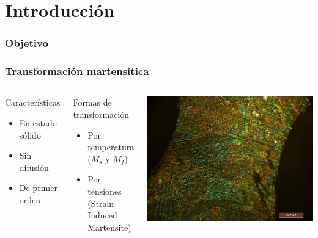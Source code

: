 \documentclass[usenames,dvipsnames]{beamer}
\begin{document}
\section{Introducción}


\begin{frame}
\frametitle{Objetivo}

\end{frame}


 \begin{frame}
 \frametitle{Transformación martensítica}

\begin{columns}
 

\begin{block}{Características}
 \begin{itemize}
  \item En estado sólido
  \item Sin difusión
  \item De primer orden
 \end{itemize}
\end{block}
 
\begin{block}{Formas de transformación}
  \begin{itemize}
  \item \alert<1>{Por temperatura ($M_s$ y $M_f$)}
  \item \alert<2>{Por tensiones (Strain Induced Martensite)}
 \end{itemize}
\end{block}


\includegraphics[width=\columnwidth]{img/intro/EspAMicro1.jpg}

\end{columns}
 
\end{frame}
\end{document}
